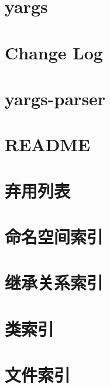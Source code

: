 \documentclass[twoside]{book}
\newcommand{\+}{\discretionary{\mbox{\scriptsize$\hookleftarrow$}}{}{}}
\begin{document}
\chapter{yargs}
\label{md__c_1_workspace_demo_src_main_script_node_modules_yargs__r_e_a_d_m_e}

\chapter{Change Log}
\label{md__c_1_workspace_demo_src_main_script_node_modules_yargs-parser__c_h_a_n_g_e_l_o_g}

\chapter{yargs-\/parser}
\label{md__c_1_workspace_demo_src_main_script_node_modules_yargs-parser__r_e_a_d_m_e}

\chapter{R\+E\+A\+D\+ME}
\label{md__c_1_workspace_demo_src_main_script__r_e_a_d_m_e}

\chapter{弃用列表}
\label{deprecated}

\chapter{命名空间索引}

\chapter{继承关系索引}

\chapter{类索引}

\chapter{文件索引}

\end{document}
